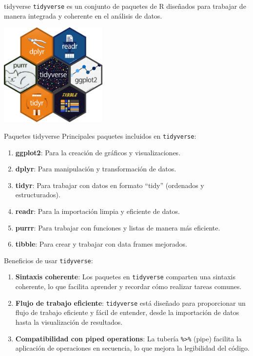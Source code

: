 \documentclass[
  ignorenonframetext,
]{beamer}
\begin{document}
\begin{frame}[fragile]{tidyverse}
\protect\hypertarget{tidyverse}{}
\texttt{tidyverse} es un conjunto de paquetes de R diseñados para
trabajar de manera integrada y coherente en el análisis de datos.

\includegraphics[width=0.4\textwidth,height=0.4\textheight]{Imagenes/tidyverse2.png}

\begin{block}{Paquetes \textbar{} tidyverse}
\protect\hypertarget{paquetes-tidyverse}{}
Principales paquetes incluidos en \texttt{tidyverse}:

\begin{enumerate}
\item
  \textbf{ggplot2}: Para la creación de gráficos y visualizaciones.
\item
  \textbf{dplyr}: Para manipulación y transformación de datos.
\item
  \textbf{tidyr}: Para trabajar con datos en formato ``tidy'' (ordenados
  y estructurados).
\item
  \textbf{readr}: Para la importación limpia y eficiente de datos.
\item
  \textbf{purrr}: Para trabajar con funciones y listas de manera más
  eficiente.
\item
  \textbf{tibble}: Para crear y trabajar con data frames mejorados.
\end{enumerate}
\end{block}

\begin{block}{Beneficios de usar \texttt{tidyverse}:}
\protect\hypertarget{beneficios-de-usar-tidyverse}{}
\begin{enumerate}
\item
  \textbf{Sintaxis coherente}: Los paquetes en \texttt{tidyverse}
  comparten una sintaxis coherente, lo que facilita aprender y recordar
  cómo realizar tareas comunes.
\item
  \textbf{Flujo de trabajo eficiente}: \texttt{tidyverse} está diseñado
  para proporcionar un flujo de trabajo eficiente y fácil de entender,
  desde la importación de datos hasta la visualización de resultados.
\item
  \textbf{Compatibilidad con piped operations}: La tubería
  \texttt{\%\textgreater{}\%} (pipe) facilita la aplicación de
  operaciones en secuencia, lo que mejora la legibilidad del código.
\end{enumerate}
\end{block}


\end{frame}
\end{document}
